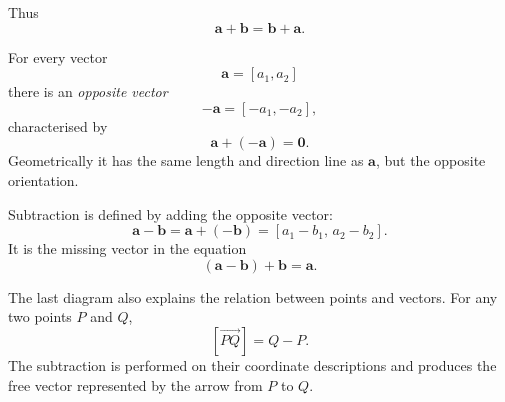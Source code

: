 Thus
\[
\boxed{
\mathbf a+\mathbf b=\mathbf b+\mathbf a
}.
\]

For every vector
\[
\mathbf a=[a_1,a_2]
\]
there is an \emph{opposite vector}
\[
\boxed{
-\mathbf a=[-a_1,-a_2]
},
\]
characterised by
\[
\mathbf a+(-\mathbf a)=\mathbf 0.
\]
Geometrically it has the same length and direction line as $\mathbf a$, but the
opposite orientation.

\begin{center}
\end{center}

Subtraction is defined by adding the opposite vector:
\[
\boxed{
\mathbf a-\mathbf b
=
\mathbf a+(-\mathbf b)
=
[a_1-b_1,\,a_2-b_2]
}.
\]
It is the missing vector in the equation
\[
(\mathbf a-\mathbf b)+\mathbf b=\mathbf a.
\]

\begin{center}
\end{center}

The last diagram also explains the relation between points and vectors. For any
two points $P$ and $Q$,
\[
[\overrightarrow{PQ}]=Q-P.
\]
The subtraction is performed on their coordinate descriptions and produces the
free vector represented by the arrow from $P$ to $Q$.